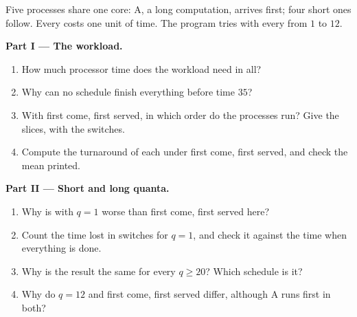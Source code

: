 \begin{problem}\label{pb:g12:processes-and-scheduling:1}
Five processes share one core: A, a long computation, arrives first; four short ones follow. Every  costs
one unit of time. The program tries  with every  from $1$ to $12$.

\label{lst:g12:processes-and-scheduling:quantum}

\label{out:g12:processes-and-scheduling:quantum}

\medskip\noindent\textbf{Part I --- The workload.}
\begin{enumerate}
  \item How much processor time does the workload need in all?
  \item Why can no schedule finish everything before time $35$?
  \item With first come, first served, in which order do the processes run? Give the slices, with the switches.
  \item Compute the turnaround of each  under first come, first served, and check the mean printed.
\end{enumerate}

\medskip\noindent\textbf{Part II --- Short and long quanta.}
\begin{enumerate}[resume]
  \item Why is  with $q = 1$ worse than first come, first served here?
  \item Count the time lost in switches for $q = 1$, and check it against the time when everything is done.
  \item Why is the result the same for every $q \ge 20$? Which schedule is it?
  \item Why do $q = 12$ and first come, first served differ, although A runs first in both?
\end{enumerate}


\end{problem}
